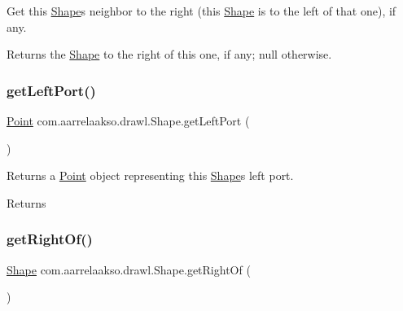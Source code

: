 Get this \hyperlink{classcom_1_1aarrelaakso_1_1drawl_1_1_shape}{Shape}\textquotesingle{}s neighbor to the right (this \hyperlink{classcom_1_1aarrelaakso_1_1drawl_1_1_shape}{Shape} is to the left of that one), if any. 

\begin{DoxyReturn}{Returns}
the \hyperlink{classcom_1_1aarrelaakso_1_1drawl_1_1_shape}{Shape} to the right of this one, if any; {\ttfamily null} otherwise. 
\end{DoxyReturn}
\mbox{\label{classcom_1_1aarrelaakso_1_1drawl_1_1_shape_aeffa96786ca552adf46924ec77da9555}} 
\subsubsection{\texorpdfstring{get\+Left\+Port()}{getLeftPort()}}
{\footnotesize\ttfamily \hyperlink{classcom_1_1aarrelaakso_1_1drawl_1_1_point}{Point} com.\+aarrelaakso.\+drawl.\+Shape.\+get\+Left\+Port (\begin{DoxyParamCaption}{ }\end{DoxyParamCaption})\hspace{0.3cm}{\ttfamily [inherited]}}



Returns a \hyperlink{classcom_1_1aarrelaakso_1_1drawl_1_1_point}{Point} object representing this \hyperlink{classcom_1_1aarrelaakso_1_1drawl_1_1_shape}{Shape}\textquotesingle{}s left port. 

\begin{DoxyReturn}{Returns}

\end{DoxyReturn}
\mbox{\label{classcom_1_1aarrelaakso_1_1drawl_1_1_shape_a1ad573b06f341aa79f6a255a476ae6e4}} 
\subsubsection{\texorpdfstring{get\+Right\+Of()}{getRightOf()}}
{\footnotesize\ttfamily \hyperlink{classcom_1_1aarrelaakso_1_1drawl_1_1_shape}{Shape} com.\+aarrelaakso.\+drawl.\+Shape.\+get\+Right\+Of (\begin{DoxyParamCaption}{ }\end{DoxyParamCaption})\hspace{0.3cm}{\ttfamily [inherited]}}



